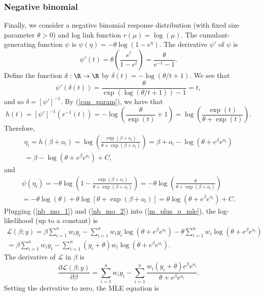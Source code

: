 \documentclass[12pt]{article}
\begin{document}
\begin{appendices}
\subsubsection*{Negative binomial}
Finally, we consider a negative binomial response distribution (with fixed size parameter $\theta > 0$) and log link function $r(\mu) = \log(\mu)$. The cumulant-generating function $\psi$ is
$\psi(\eta) = -\theta \log(1 - e^\eta).$ The derivative $\psi'$ of $\psi$ is
$$ \psi'(t) = \theta \left(\frac{e^t}{1 - e^t}\right) = \frac{\theta}{e^{-t} - 1}.$$ Define the function $\delta: \R \to \R$ by $\delta(t) = -\log\left(\theta/t + 1 \right).$ We see that
$$\psi'(\delta(t)) = \frac{\theta}{\exp\left(\log(\theta/t + 1 )\right) - 1} = t,$$ and so $\delta = [\psi']^{-1}.$ By (\ref{can_param}), we have that
$$
h(t) = [\psi']^{-1}(r^{-1}(t)) = -\log\left(\frac{\theta}{\exp(t)} + 1 \right) = \log\left(\frac{\exp(t)}{\theta + \exp(t)}\right).
$$
Therefore,
\begin{multline}\label{nb_mo_1}
\eta_i = h(\beta + o_i) = \log\left(\frac{\exp(\beta+o_i)}{\theta + \exp(\beta + o_i)} \right) = \beta + o_i - \log\left(\theta + e^{\beta}e^{o_i}\right) \\ = \beta - \log\left(\theta + e^{\beta}e^{o_i} \right) + C,
\end{multline}
 and
 \begin{multline}\label{nb_mo_2}
 \psi(\eta_i) = -\theta\log\left(1 - \frac{\exp(\beta+o_i)}{\theta + \exp(\beta + o_i)} \right) = -\theta \log \left(\frac{\theta}{\theta + \exp(\beta + o_i)} \right) \\ = -\theta \log (\theta) + \theta \log[\theta + \exp(\beta + o_i)] = \theta \log(\theta + e^{\beta}e^{o_i}) + C.
 \end{multline}
 Plugging (\ref{nb_mo_1}) and (\ref{nb_mo_2}) into (\ref{m_plus_o_mle}), the log-likelihood (up to a constant) is
\begin{multline*}
\mathcal{L}(\beta; y) = \beta \sum_{i=1}^n w_i y_i - \sum_{i=1}^n w_i y_i \log(\theta + e^\beta e^{o_i}) - \theta \sum_{i=1}^n w_i \log(\theta + e^\beta  e^{o_i}) \\ = \beta \sum_{i=1}^n w_i y_i - \sum_{i=1}^n (y_i + \theta)w_i\log(\theta + e^\beta e^{o_i}).
\end{multline*}
The derivative of $\mathcal{L}$ in $\beta$ is
$$\frac{\partial \mathcal{L}(\beta;y)}{\partial \beta} = \sum_{i=1}^n w_i y_i  - \sum_{i=1}^n \frac{w_i(y_i + \theta) e^{\beta} e^{o_i}}{ \theta + e^{\beta} e^{o_i}}.$$
Setting the derivative to zero, the MLE equation is
\begin{equation}\label{nb_mle}

\end{equation}
\end{appendices}
\end{document}
